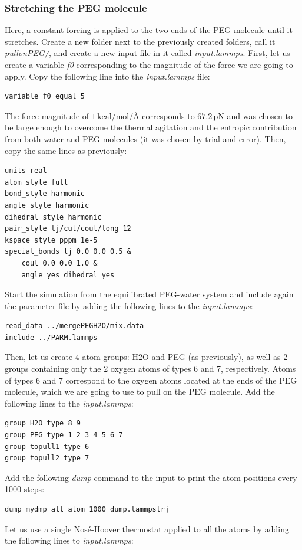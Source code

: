 \documentclass[9pt,tutorial]{livecoms}
\begin{document}
\subsubsection{Stretching the PEG molecule}
Here, a constant forcing is applied to the two ends of the PEG molecule until it stretches. Create a new folder next to the previously created folders, call it \textit{pullonPEG/}, and create a new input file in it called \textit{input.lammps}. First, let us create a variable \textit{f0} corresponding to the magnitude of the force we are going to apply. Copy the following line into the \textit{input.lammps} file:
{\normalsize \begin{verbatim}
variable f0 equal 5
\end{verbatim}}
The force magnitude of $1\,\text{kcal/mol/Å}$ corresponds to $67.2\,\text{pN}$ and was chosen to be large enough to overcome the thermal agitation and the entropic contribution from both water and PEG molecules (it was chosen by trial and error). Then, copy the same lines as previously:
{\normalsize \begin{verbatim}
units real
atom_style full
bond_style harmonic
angle_style harmonic
dihedral_style harmonic
pair_style lj/cut/coul/long 12
kspace_style pppm 1e-5
special_bonds lj 0.0 0.0 0.5 &
    coul 0.0 0.0 1.0 &
    angle yes dihedral yes
\end{verbatim}}
Start the simulation from the equilibrated PEG-water system and include again the parameter file by adding the following lines to the \textit{input.lammps}:
{\normalsize \begin{verbatim}
read_data ../mergePEGH2O/mix.data
include ../PARM.lammps
\end{verbatim}}
Then, let us create 4 atom groups: H2O and PEG (as previously), as well as 2 groups containing only the 2 oxygen atoms of types 6 and 7, respectively. Atoms of types 6 and 7 correspond to the oxygen atoms located at the ends of the PEG molecule, which we are going to use to pull on the PEG molecule. Add the following lines to the \textit{input.lammps}:
{\normalsize \begin{verbatim}
group H2O type 8 9
group PEG type 1 2 3 4 5 6 7
group topull1 type 6
group topull2 type 7
\end{verbatim}}
Add the following \textit{dump} command to the input to print the atom positions every 1000 steps:
{\normalsize \begin{verbatim}
dump mydmp all atom 1000 dump.lammpstrj
\end{verbatim}}
Let us use a single Nosé-Hoover thermostat applied to all the atoms by adding the following lines to \textit{input.lammps}:
\end{document}

